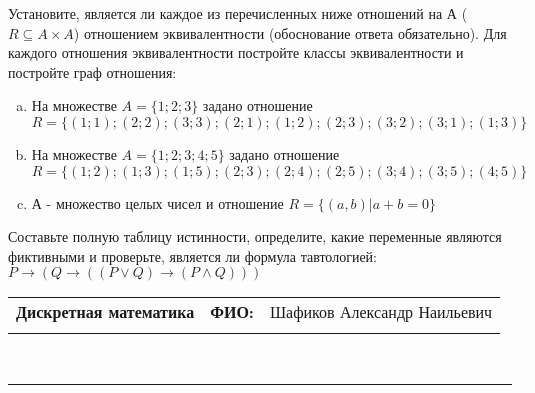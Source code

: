 \documentclass[10pt]{exam}
\newcommand{\class}{Дискретная математика}
\newcommand{\examdate}{}
\begin{document}
\begin{questions}
\question
Установите, является ли каждое из перечисленных ниже отношений на А ($R \subseteq A \times A$) отношением эквивалентности (обоснование ответа обязательно). Для каждого отношения эквивалентности постройте классы 
эквивалентности и постройте граф отношения:
\begin{enumerate} [a)]\setcounter{enumi}{0}
\item На множестве $A = \{1; 2; 3\}$ задано отношение $R = \{(1; 1); (2; 2); (3; 3); (2; 1); (1; 2); (2; 3); (3; 2); (3; 1); (1; 3)\}$
\item На множестве $A = \{1; 2; 3; 4; 5\}$ задано отношение $R = \{(1; 2); (1; 3); (1; 5); (2; 3); (2; 4); (2; 5); (3; 4); (3; 5); (4; 5)\}$
\item А - множество целых чисел и отношение $R = \{(a,b)|a + b = 0\}$
\end{enumerate}\question Составьте полную таблицу истинности, определите, какие переменные являются фиктивными и проверьте, является ли формула тавтологией:
$ P \rightarrow (Q \rightarrow ((P \lor Q) \rightarrow (P \land Q)))$

\end{questions}
\newpage
\begin{flushright}
\begin{tabular}{p{2.8in} r l}
\textbf{\class} & \textbf{ФИО:} &Шафиков Александр Наильевич
\\

\textbf{\examdate} &&\\
\end{tabular}\\
\end{flushright}
\rule[1ex]{\textwidth}{.1pt}
\end{document}
